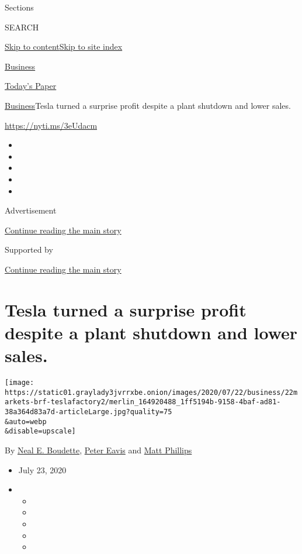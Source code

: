 Sections

SEARCH

\protect\hyperlink{site-content}{Skip to
content}\protect\hyperlink{site-index}{Skip to site index}

\href{https://www.nytimes3xbfgragh.onion/section/business}{Business}

\href{https://myaccount.nytimes3xbfgragh.onion/auth/login?response_type=cookie\&client_id=vi}{}

\href{https://www.nytimes3xbfgragh.onion/section/todayspaper}{Today's
Paper}

\href{/section/business}{Business}\textbar{}Tesla turned a surprise
profit despite a plant shutdown and lower sales.

\url{https://nyti.ms/3eUdacm}

\begin{itemize}
\item
\item
\item
\item
\item
\end{itemize}

Advertisement

\protect\hyperlink{after-top}{Continue reading the main story}

Supported by

\protect\hyperlink{after-sponsor}{Continue reading the main story}

\hypertarget{tesla-turned-a-surprise-profit-despite-a-plant-shutdown-and-lower-sales}{%
\section{Tesla turned a surprise profit despite a plant shutdown and
lower
sales.}\label{tesla-turned-a-surprise-profit-despite-a-plant-shutdown-and-lower-sales}}

\texttt{[image: https://static01.graylady3jvrrxbe.onion/images/2020/07/22/business/22markets-brf-teslafactory2/merlin\_164920488\_1ff5194b-9158-4baf-ad81-38a364d83a7d-articleLarge.jpg?quality=75\\\&auto=webp\\\&disable=upscale]}

By \href{https://www.nytimes3xbfgragh.onion/by/neal-e-boudette}{Neal E.
Boudette},
\href{https://www.nytimes3xbfgragh.onion/by/peter-eavis}{Peter Eavis}
and \href{https://www.nytimes3xbfgragh.onion/by/matt-phillips}{Matt
Phillips}

\begin{itemize}
\item
  July 23, 2020
\item
  \begin{itemize}
  \item
  \item
  \item
  \item
  \item
  \end{itemize}
\end{itemize}

